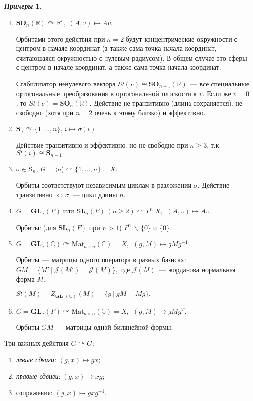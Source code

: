 \documentclass[a4paper, 14pt]{extarticle}
\newcommand{\n}{\par}
\newcommand{\real}{\mathbb{R}}
\newcommand{\complex}{\mathbb{C}}
\newcommand{\GL}{\mathbf{GL}}
\newcommand{\SL}{\mathbf{SL}}
\newcommand{\SOrth}{\mathbf{SO}}
\newcommand{\symmetrical}{\mathbf{S}}
\theoremstyle{definition}
\newtheorem*{exmpls}{\textit{Примеры}}
\theoremstyle{plain}
\numberwithin{theorem}{section}
\numberwithin{definition}{section}
\numberwithin{statement}{section}
\numberwithin{lemma}{section}
\numberwithin{consequence}{section}
\begin{document}
        \begin{exmpls}
            \
            \begin{enumerate}
                \setlength\itemsep{0.1em}
                \item ${\SOrth_n(\real) \curvearrowright \real^n, \ (A,v) \mapsto Av.}$\n
                Орбитами этого действия при ${n = 2}$ будут концентрические окружности с центром в начале координат (а также сама точка начала координат, считающаяся окружностью с нулевым радиусом). В общем случае это сферы с центром в начале координат, а также сама точка начала координат.\n
                Стабилизатор ненулевого вектора ${St(v) \cong \SOrth_{n - 1}(\real)}$~--- все специальные ортогональные преобразования в ортогональной плоскости к $v$. Если же $v = 0$, то $St(v) = \SOrth_n(\real)$.
                Действие не транзитивно (длина сохраняется), не свободно (хотя при ${n = 2}$ очень к этому близко) и эффективно.
                \item ${\symmetrical_n \curvearrowright \{1,\ldots, n\}, \ i \mapsto \sigma(i)}.$ \n
                Действие транзитивно и эффективно, но не свободно при $n \geqslant 3$, т.к. ${St(i) \cong \symmetrical_{n-1}.}$ 
                \item ${\sigma \in \symmetrical_n, \ G = \langle \sigma \rangle \curvearrowright \{1,\ldots, n\} = X.}$\n
                Орбиты соответствуют независимым циклам в разложении $\sigma$.\newline
                Действие транзитивно $\Leftrightarrow \sigma$~--- цикл длины $n$.
                \item ${G = \GL_n(F)}$ или ${\SL_n(F) \ (n \geqslant 2) \curvearrowright F^n \ X, \ \ (A,v) \mapsto Av.}$\n
                Орбиты: (для ${\SL_n(F)}$ при ${n > 1}$) ${F^n \, \backslash \, \{0\}}$ и $\{0\}$.
                \item ${G = \GL_n(\complex) \curvearrowright \mathrm{Mat}_{n \times n}(\complex) = X, \ \ (g,M) \mapsto gMg^{-1}.}$\n
                Орбиты~--- матрицы одного оператора в разных базисах: ${GM = \{M' \ | \ \mathcal{J}(M') = \mathcal{J}(M)\},}$ где $\mathcal{J}(M)$~--- жорданова нормальная форма $M$.\n
                ${St(M) = Z_{\GL_n(\complex)}(M) = \{g \ | \ gM = Mg\}.}$
                \item ${G = \GL_n(F) \curvearrowright \mathrm{Mat}_{n \times n}(\complex) = X, \ \ (g,M) \mapsto gMg^T.}$\n
                Орбиты $GM$~--- матрицы одной билинейной формы.
            \end{enumerate}
            Три важных действия ${G \curvearrowright G}$:
            \begin{enumerate}
                \setlength\itemsep{0.1em}
                \item \textit{левые сдвиги}: ${(g,x) \mapsto gx;}$
                \item \textit{правые сдвиги}: ${(g,x) \mapsto xg;}$
                \item сопряжения: ${(g,x) \mapsto gxg^{-1}.}$
            \end{enumerate}
        \end{exmpls}
\end{document}
